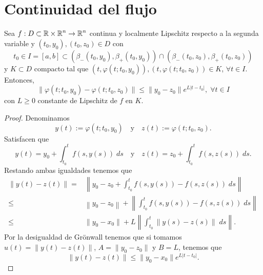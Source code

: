 \section{Continuidad del flujo}
\begin{prop}
Sea $\displaystyle f : D \subset \mathbb{R} \times \mathbb{R}^{n} \to \mathbb{R}^{n} $ continua y localmente Lipschitz respecto a la segunda variable y $\displaystyle \left(t_{0}, y_{0}\right), \left(t_{0}, z_{0}\right)\in D $ con
\[t_{0} \in I = \left[a,b\right] \subset\left(\beta_{-}\left(t_{0}, y_{0}\right), \beta_{+ }\left(t_{0}, y_{0}\right)\right)\cap \left(\beta_{-}\left(t_{0}, z_{0}\right), \beta_{+ }\left(t_{0}, z_{0}\right)\right) \]
y $\displaystyle K \subset D $ compacto tal que $\displaystyle \left(t, \varphi\left(t; t_{0}, y_{0}\right)\right), \left(t, \varphi\left(t; t_{0}, z_{0}\right)\right)\in K $, $\displaystyle \forall t \in I $. 
Entonces, 
\[ \|\varphi\left(t; t_{0}, y_{0}\right)-\varphi\left(t; t_{0}, z_{0}\right)\|\leq \|y_{0}-z_{0}\|e^{L \left|t-t_{0}\right|} , \; \forall t \in I\]
con $\displaystyle L \geq 0 $ constante de Lipschitz de $\displaystyle f $ en $\displaystyle K $. 
\end{prop}
\begin{proof}
Denominamos 
\[y\left(t\right):=\varphi\left(t; t_{0}, y_{0}\right)\quad \text{y} \quad z\left(t\right):=\varphi\left(t; t_{0}, z_{0}\right) .\]
Satisfacen que 
\[y\left(t\right)=y_{0} + \int^{t}_{t_{0}} f\left(s, y\left(s\right)\right) \; d s \quad \text{y} \quad z\left(t\right)=z_{0}+\int^{t}_{t_{0}} f\left(s, z\left(s\right)\right) \; d s .\]
Restando ambas igualdades tenemos que 
\[
\begin{split}
	\left\|y\left(t\right)-z\left(t\right)\right\| = & \left\|y_{0}-z_{0} + \int^{t}_{t_{0}} f\left(s,y\left(s\right)\right)-f\left(s,z\left(s\right)\right) \; d s\right\|\\
	\leq & \left\|y_{0}-z_{0}\right\| + \left\|\int^{t}_{t_{0}} f\left(s, y\left(s\right)\right)-f\left(s, z\left(s\right)\right) \; d s\right\|\\
	\leq & \|y_{0}-x_{0}\| + L \left\|\int^{t}_{t_{0}} \left\|y\left(s\right)-z\left(s\right)\right\| \; d s\right\|.
\end{split}
\]
Por la desigualdad de Grönwall tenemos que si tomamos $\displaystyle u\left(t\right)= \left\|y\left(t\right)-z\left(t\right)\right\| $, $\displaystyle A = \|y_{0}-z_{0}\| $ y $\displaystyle B = L $, tenemos que 
\[\|y\left(t\right)-z\left(t\right)\| \leq \|y_{0}-x_{0}\|e^{L \left|t-t_{0}\right|} .\]
\end{proof}
